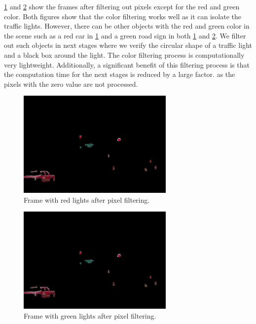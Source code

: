 

\ref{f:red_fil} and \ref{f:green_fil} show the frames after filtering out pixels except for the red and green color. 
Both figures show that the color filtering works well as it can isolate the traffic lights. 
However, there can be other objects with the red and green color in the scene such as a red car in \ref{f:red_fil} and a green road sign in both \ref{f:red_fil} and \ref{f:green_fil}.
We filter out such objects in next stages where we verify the circular shape of a traffic light and a black box around the light.
The color filtering process is computationally very lightweight.
Additionally, a significant benefit of this filtering process is that the computation time for the next stages is reduced by a large factor.
as the pixels with the zero value are not processed.


\begin{figure}[!ht]
  \centering
  \includegraphics[width=3in]{images/RedGreenfiltering_red.pdf}
  \caption{Frame with red lights after pixel filtering.}
  \label{f:red_fil}
\end{figure}

\begin{figure}[!ht]
  \centering
  \includegraphics[width=3in]{images/RedGreenfiltering_red.pdf}
  \caption{Frame with green lights after pixel filtering.}
  \label{f:green_fil}
\end{figure}

